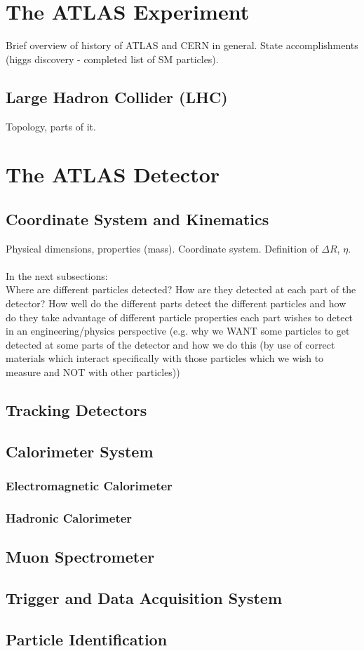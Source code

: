 \section{The ATLAS Experiment}
Brief overview of history of ATLAS and CERN in general. State accomplishments (higgs discovery - completed list of SM particles). 
\subsection{Large Hadron Collider (LHC)}
Topology, parts of it.
\section{The ATLAS Detector}
\subsection{Coordinate System and Kinematics}
Physical dimensions, properties (mass). Coordinate system. Definition of $\Delta R$, $\eta$.\\\\
In the next subsections:\\
Where are different particles detected? How are they detected at each part of the detector? How well do the different parts detect the different particles and how do they take advantage of different particle properties each part wishes to detect in an engineering/physics perspective (e.g. why we WANT some particles to get detected at some parts of the detector and how we do this (by use of correct materials which interact specifically with those particles which we wish to measure and NOT with other particles))
\subsection{Tracking Detectors}
\subsection{Calorimeter System}
\subsubsection{Electromagnetic Calorimeter}
\subsubsection{Hadronic Calorimeter}
\subsection{Muon Spectrometer}
\subsection{Trigger and Data Acquisition System}
\subsection{Particle Identification} 
